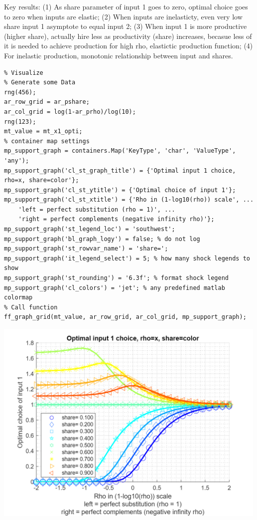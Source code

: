 \documentclass[
]{book}
\begin{document}
Key results: (1) As share parameter of input 1 goes to zero, optimal
choice goes to zero when inputs are elastic; (2) When inputs are
inelasticty, even very low share input 1 asymptote to equal input 2; (3)
When input 1 is more productive (higher share), actually hire less as
productivity (share) increases, becasue less of it is needed to achieve
production for high rho, elastictic production function; (4) For
inelastic production, monotonic relationship between input and shares.

\begin{verbatim}
% Visualize
% Generate some Data
rng(456);
ar_row_grid = ar_pshare;
ar_col_grid = log(1-ar_prho)/log(10);
rng(123);
mt_value = mt_x1_opti;
% container map settings
mp_support_graph = containers.Map('KeyType', 'char', 'ValueType', 'any');
mp_support_graph('cl_st_graph_title') = {'Optimal input 1 choice, rho=x, share=color'};
mp_support_graph('cl_st_ytitle') = {'Optimal choice of input 1'};
mp_support_graph('cl_st_xtitle') = {'Rho in (1-log10(rho)) scale', ...
    'left = perfect substitution (rho = 1)', ...
    'right = perfect complements (negative infinity rho)'};
mp_support_graph('st_legend_loc') = 'southwest';
mp_support_graph('bl_graph_logy') = false; % do not log
mp_support_graph('st_rowvar_name') = 'share=';
mp_support_graph('it_legend_select') = 5; % how many shock legends to show
mp_support_graph('st_rounding') = '6.3f'; % format shock legend
mp_support_graph('cl_colors') = 'jet'; % any predefined matlab colormap
% Call function
ff_graph_grid(mt_value, ar_row_grid, ar_col_grid, mp_support_graph);
\end{verbatim}

\includegraphics[width=5.20833in,height=\textheight]{img/bfwx_crs_nested_ces_images/figure_0.png}
\end{document}
